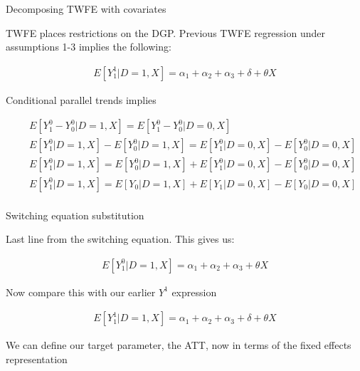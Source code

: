 \documentclass{beamer}
\begin{document}
\begin{frame}{Decomposing TWFE with covariates}

TWFE places restrictions on the DGP. Previous TWFE regression under assumptions 1-3 implies the following:

\bigskip

\begin{eqnarray*}
E[Y^1_1|D=1,X] = \alpha_1 + \alpha_2 + \alpha_3 + \delta + \theta X
\end{eqnarray*}

\bigskip

Conditional parallel trends implies

\small
\begin{eqnarray*}
&&E[Y^0_{1} - Y^0_{0}|D=1,X]= E[Y^0_{1} - Y^0_{0}|D=0,X] \\
&&E[Y^0_{1}|D=1,X] - E[Y^0_{0}|D=1,X]= E[Y^0_{1}|D=0,X] - E[Y^0_{0}|D=0,X] \\
&&E[Y^0_{1}|D=1,X] = E[Y^0_{0}|D=1,X] + E[Y^0_{1}|D=0,X] - E[Y^0_{0}|D=0,X] \\
&&E[Y^0_{1}|D=1,X] = E[Y_{0}|D=1,X] + E[Y_{1}|D=0,X] - E[Y_{0}|D=0,X] \\
\end{eqnarray*}


\end{frame}

\begin{frame}{Switching equation substitution}

Last line from the switching equation. This gives us:

\begin{eqnarray*}
E[Y^0_{1}|D=1,X] = \alpha_1  + \alpha_2 + \alpha_3 + \theta X
\end{eqnarray*}

Now compare this with our earlier $Y^1$ expression

\begin{eqnarray*}
E[Y^1_1|D=1,X] = \alpha_1 + \alpha_2 + \alpha_3 + \delta + \theta X
\end{eqnarray*}

We can define our target parameter, the ATT, now in terms of the fixed effects representation

\end{frame}
\end{document}

